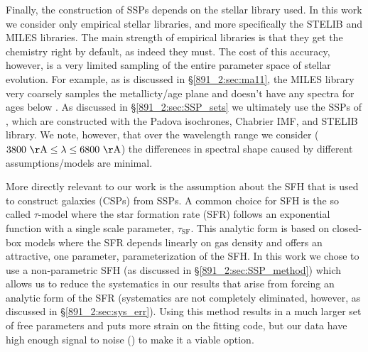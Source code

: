 Finally, the construction of SSPs depends on the stellar library
used. In this work we consider only empirical stellar libraries, and
more specifically the STELIB \citep{LeBorgne03} and MILES
\citep{Sanchez-Blazquez06} libraries. The main strength of empirical
libraries is that they get the chemistry right by default, as indeed
they must. The cost of this accuracy, however, is a very limited
sampling of the entire parameter space of stellar evolution. For
example, as is discussed in \S\ref{891_2:sec:ma11}, the MILES library
very coarsely samples the metallicty/age plane and doesn't have any
spectra for ages below . 
As discussed in \S\ref{891_2:sec:SSP_sets} we ultimately use the SSPs
of \citet{Bruzual03}, which are constructed with the Padova
isochrones, Chabrier IMF, and STELIB library. We note, however, that
over the wavelength range we consider ($\val{3800}{\AA}
\leq\lambda\leq \val{6800}{\AA}$) the differences in spectral shape
caused by different assumptions/models are minimal.

More directly relevant to our work is the assumption about the SFH
that is used to construct galaxies (CSPs) from SSPs. A common choice
for SFH is the so called $\tau$-model where the star formation rate
(SFR) follows an exponential function with a single scale parameter,
$\tau_\mathrm{SF}$. This analytic form is based on closed-box models
where the SFR depends linearly on gas density \citep{Schmidt59} and
offers an attractive, one parameter, parameterization of the SFH. In
this work we chose to use a non-parametric SFH (as discussed in
\S\ref{891_2:sec:SSP_method}) which allows us to reduce the
systematics in our results that arise from forcing an analytic form of
the SFR (systematics are not completely eliminated, however, as
discussed in \S\ref{891_2:sec:sys_err}). Using this method results in
a much larger set of free parameters and puts more strain on the
fitting code, but our data have high enough signal to noise
() to make it a viable option.

